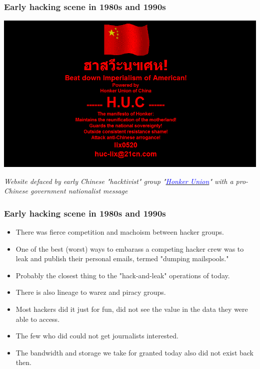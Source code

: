 \documentclass[aspectratio=169,usenames,dvipsnames]{beamer}
\begin{document}
\begin{frame}[b]
  \frametitle{Early hacking scene in 1980s and 1990s}

  \centering

  \includegraphics[width=\textwidth,height=0.6\textheight,keepaspectratio]{img/honkers_union.png}

  \footnotesize
  \emph{Website defaced by early Chinese "hacktivist" group
  "\href{https://en.wikipedia.org/wiki/Honker_Union}{\textcolor{blue}{Honker Union}}"
  with a pro-Chinese government nationalist message}
  \vspace{1cm}
\end{frame}

\begin{frame}
  \frametitle{Early hacking scene in 1980s and 1990s}

  \begin{itemize}[<+->]
    \item There was fierce competition and machoism between hacker groups.
    \item One of the best (worst) ways to embarass a competing hacker crew was
      to leak and publish their personal emails, termed "dumping mailspools."
    \item Probably the closest thing to the "hack-and-leak" operations of
      today.
    \item There is also lineage to warez and piracy groups.
    \item Most hackers did it just for fun, did not see the value in the data
      they were able to access.
    \item The few who did could not get journalists interested.
    \item The bandwidth and storage we take for granted today also did not
      exist back then.
  \end{itemize}

\end{frame}
\end{document}
